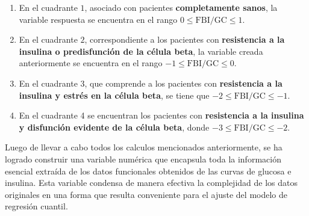 \begin{enumerate}
    \item En el cuadrante $1$, asociado con pacientes \textbf{completamente sanos}, la variable respuesta se encuentra en el rango $0 \leq \text{FBI/GC} \leq 1$.
    \item En el cuadrante $2$, correspondiente a los pacientes con \textbf{resistencia a la insulina o predisfunción de la célula beta}, la variable creada anteriormente se encuentra en el rango $-1 \leq \text{FBI/GC} \leq 0$.
    \item En el cuadrante $3$, que comprende a los pacientes con \textbf{resistencia a la insulina y estrés en la célula beta}, se tiene que $-2 \leq \text{FBI/GC} \leq -1$.
    \item En el cuadrante 4 se encuentran los pacientes con \textbf{resistencia a la insulina y disfunción evidente de la célula beta}, donde $-3 \leq \text{FBI/GC} \leq -2$.
\end{enumerate}

 Luego de llevar a cabo todos los calculos mencionados anteriormente, se ha logrado construir una variable numérica que encapsula toda la información esencial extraída de los datos funcionales obtenidos de las curvas de glucosa e insulina. Esta variable condensa de manera efectiva la complejidad de los datos originales en una forma que resulta conveniente para el ajuste del modelo de regresión cuantil.